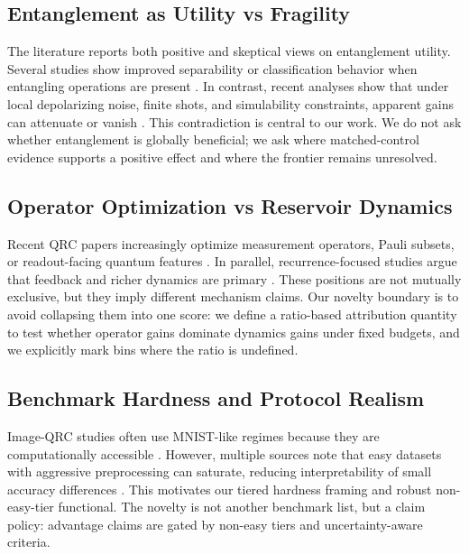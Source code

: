 \documentclass{article} %
\begin{document}
\subsection{Entanglement as Utility vs Fragility}
The literature reports both positive and skeptical views on entanglement utility. Several studies show improved separability or classification behavior when entangling operations are present \citep{arxiv_2403_08998,arxiv_2209_05142,arxiv_2511_01387}. In contrast, recent analyses show that under local depolarizing noise, finite shots, and simulability constraints, apparent gains can attenuate or vanish \citep{arxiv_2509_06873,arxiv_2601_23084}. This contradiction is central to our work. We do not ask whether entanglement is globally beneficial; we ask where matched-control evidence supports a positive effect and where the frontier remains unresolved.

\subsection{Operator Optimization vs Reservoir Dynamics}
Recent QRC papers increasingly optimize measurement operators, Pauli subsets, or readout-facing quantum features \citep{arxiv_2602_14677,arxiv_2602_18377,arxiv_2602_17440}. In parallel, recurrence-focused studies argue that feedback and richer dynamics are primary \citep{arxiv_2503_17939,arxiv_2503_22380,arxiv_2601_04812}. These positions are not mutually exclusive, but they imply different mechanism claims. Our novelty boundary is to avoid collapsing them into one score: we define a ratio-based attribution quantity to test whether operator gains dominate dynamics gains under fixed budgets, and we explicitly mark bins where the ratio is undefined.

\subsection{Benchmark Hardness and Protocol Realism}
Image-QRC studies often use MNIST-like regimes because they are computationally accessible \citep{arxiv_2409_00998,arxiv_2212_08693}. However, multiple sources note that easy datasets with aggressive preprocessing can saturate, reducing interpretability of small accuracy differences \citep{arxiv_2412_06758,arxiv_2601_22194,arxiv_2512_11367,arxiv_2512_18612}. This motivates our tiered hardness framing and robust non-easy-tier functional. The novelty is not another benchmark list, but a claim policy: advantage claims are gated by non-easy tiers and uncertainty-aware criteria.
\end{document}
